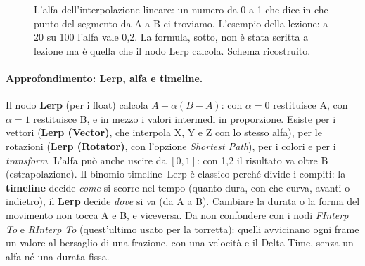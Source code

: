 \begin{figure}[htbp]
\centering
{}
\caption{L'alfa dell'interpolazione lineare: un numero da 0 a 1 che dice in che punto
del segmento da A a B ci troviamo. L'esempio della lezione: a 20 su 100 l'alfa vale
0,2. La formula, sotto, non è stata scritta a lezione ma è quella che il nodo Lerp
calcola. Schema ricostruito.}
\label{ue6:fig:lerp}
\end{figure}

\paragraph{Approfondimento: Lerp, alfa e timeline.} Il nodo \textbf{Lerp} (per i float)
calcola $A + \alpha(B - A)$: con $\alpha = 0$ restituisce A, con $\alpha = 1$
restituisce B, e in mezzo i valori intermedi in proporzione. Esiste per i vettori
(\textbf{Lerp (Vector)}, che interpola X, Y e Z con lo stesso alfa), per le rotazioni
(\textbf{Lerp (Rotator)}, con l'opzione \emph{Shortest Path}), per i colori e per i
\emph{transform}. L'alfa può anche uscire da $[0, 1]$: con 1,2 il risultato va oltre B
(estrapolazione). Il binomio timeline--Lerp è classico perché divide i compiti: la
\textbf{timeline} decide \emph{come} si scorre nel tempo (quanto dura, con che curva,
avanti o indietro), il \textbf{Lerp} decide \emph{dove} si va (da A a B). Cambiare la
durata o la forma del movimento non tocca A e B, e viceversa. Da non confondere con i nodi
\emph{FInterp To} e \emph{RInterp To} (quest'ultimo usato per la torretta): quelli
avvicinano ogni frame un valore al bersaglio di una frazione, con una velocità e il
Delta Time, senza un alfa né una durata fissa.


